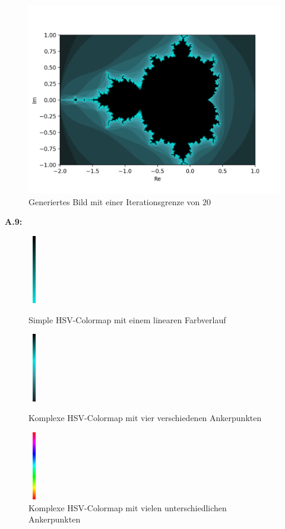 \begin{figure}[H]
\begin{minipage}[t]{0.48\textwidth}
  \label{app:8.6}
\end{minipage}
\begin{minipage}[t]{\textwidth}
  \centering
  \includegraphics[width=0.48\linewidth]{images/maxBorder/20}
  \vspace*{-4ex}
  \caption{Generiertes Bild mit einer Iterationsgrenze von $20$}
  \label{app:8.7}
\end{minipage}
\label{fig:mandelbrot-set-max-border-2}
\end{figure}

\noindent\textbf{A.9:}\label{app:9}
\begin{figure}[H]
\centering
\begin{minipage}[t]{0.30\textwidth}
  \centering
  \includegraphics[width=0.5cm, height=3cm]{images/simple_color_map}
  \caption{Simple HSV-Colormap mit einem linearen Farbverlauf}
  \label{app:9.1}
\end{minipage}%
\hfill
\begin{minipage}[t]{0.30\textwidth}
 \centering
 \includegraphics[width=0.5cm, height=3cm]{images/used_color_map}
 \caption{Komplexe HSV-Colormap mit vier verschiedenen Ankerpunkten}
 \label{app:9.2}
\end{minipage}%
\hfill
\begin{minipage}[t]{0.30\textwidth}
 \centering
 \includegraphics[width=0.5cm, height=3cm]{images/complex_color_map}
 \caption{Komplexe HSV-Colormap mit vielen unterschiedlichen Ankerpunkten}
 \label{app:9.3}
\end{minipage}
\label{fig:color-maps}
\end{figure}

